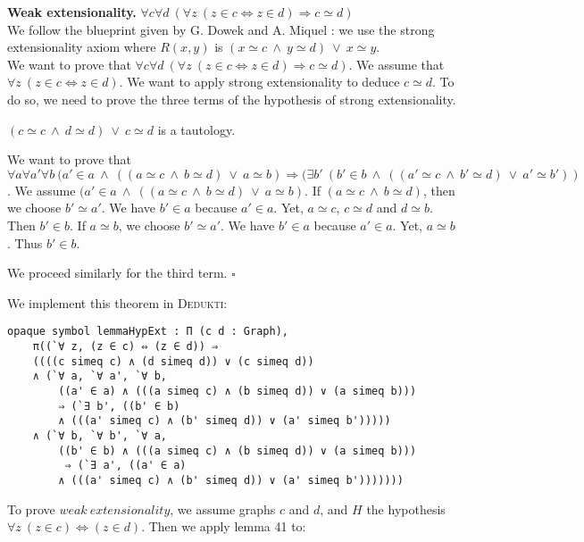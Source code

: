 \documentclass[submission,copyright,creativecommons]{eptcs}
\def\imp{\mathbin{\Rightarrow}}
\def\fa{{\forall}}
\def\conj{\mathbin{\wedge}}
\def\disj{\mathbin{\vee}}
\def\ex{{\exists}}
\newenvironment{proof}{\noindent {\em Proof.}}{\medskip}
\newcommand{\dedukti}{\textsc{Dedukti}}
\begin{document}
\textbf{Weak extensionality.} $\fa c\fa d~ (\fa z~ (z \in c \Leftrightarrow z \in d) \imp c \simeq d)$ \\

We follow the blueprint given by G. Dowek and A. Miquel \cite[see Proposition 1]{zermodulo} : we use the strong extensionality axiom where $R(x,y)$ is $(x \simeq c~\conj~y \simeq d)~\disj~x \simeq y$. \\

\begin{proof}
We want to prove that $\fa c\fa d~(\fa z~ (z \in c \Leftrightarrow z \in d) \imp c \simeq d)$. We assume that $\fa z~ (z \in c \Leftrightarrow z \in d)$. We want to apply strong extensionality to deduce $c \simeq d$. To do so, we need to prove the three terms of the hypothesis of strong extensionality.

$(c \simeq c~\conj~d \simeq d)~\disj~c \simeq d$ is a tautology.

We want to prove that $\fa a\fa a'\fa b~(a' \in a~\conj~((a \simeq c~\conj~b \simeq d)~\disj~a \simeq b) \imp (\ex b'~ (b' \in b~\conj~((a' \simeq c~\conj~b' \simeq d)~\disj~a' \simeq b'))$. We assume $(a' \in a~\conj~((a \simeq c~\conj~b \simeq d)~\disj~a \simeq b)$. If $(a \simeq c~\conj~b \simeq d)$, then we choose $b' \simeq a'$. We have $b' \in a$ because $a' \in a$. Yet, $a \simeq c$, $c \simeq d$ and $d \simeq b$. Then $b' \in b$. If $a \simeq b$, we choose $b' \simeq a'$. We have $b' \in a$ because $a' \in a$. Yet, $a \simeq b$. Thus $b' \in b$.

We proceed similarly for the third term. $\square$
\end{proof}

We implement this theorem in \dedukti:

\begin{lstlisting}
opaque symbol lemmaHypExt : Π (c d : Graph), 
	π((`∀ z, (z ∈ c) ⇔ (z ∈ d)) ⇒ 
	((((c simeq c) ∧ (d simeq d)) ∨ (c simeq d))
	∧ (`∀ a, `∀ a', `∀ b, 
		((a' ∈ a) ∧ (((a simeq c) ∧ (b simeq d)) ∨ (a simeq b))) 
		⇒ (`∃ b', ((b' ∈ b) 
		∧ (((a' simeq c) ∧ (b' simeq d)) ∨ (a' simeq b')))))
	∧ (`∀ b, `∀ b', `∀ a, 
		((b' ∈ b) ∧ (((a simeq c) ∧ (b simeq d)) ∨ (a simeq b)))
		 ⇒ (`∃ a', ((a' ∈ a) 
	 	∧ (((a' simeq c) ∧ (b' simeq d)) ∨ (a' simeq b')))))))
\end{lstlisting}

To prove $weak \ extensionality$, we assume graphs $c$ and $d$, and $H$ the hypothesis $\fa z~ (z \in c) \Leftrightarrow (z \in d)$. Then we apply lemma 41 to:
\end{document}
